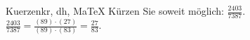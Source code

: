 \begin{MAufgabe}{Kuerzen}{kr, dh, MaTeX}
K\"urzen Sie soweit m\"oglich: $\frac{2403}{7387}$.\\ 
\ifLsg\MLoesung
\quad $\frac{2403}{7387}=\frac{(89)\cdot(27)}{(89)\cdot(83)}=\frac{27}{83}$.\else\relax\fi
 \end{MAufgabe}